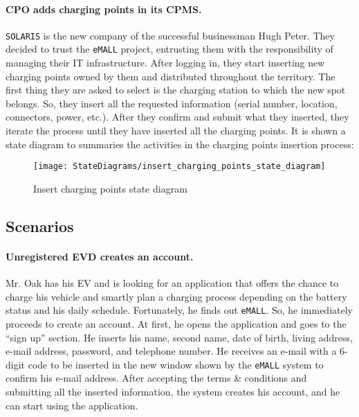 \paragraph{CPO adds charging points in its CPMS.}
\verb|SOLARIS| is the new company of the successful businessman Hugh Peter.
They decided to trust the \verb|eMALL| project, entrusting them with the responsibility of managing their IT infrastructure.
After logging in, they start inserting new charging points owned by them and distributed throughout the territory.
The first thing they are asked to select is the charging station to which the new spot belongs.
So, they insert all the requested information (serial number, location, connectors, power, etc.).
After they confirm and submit what they inserted, they iterate the process until they have inserted all the charging points.
It is shown a state diagram to summaries the activities in the charging points insertion process:
\begin{figure}[H]
    \begin{center}
        \texttt{[image: StateDiagrams/insert\_charging\_points\_state\_diagram]}
        \caption{Insert charging points state diagram}
        \label{fig:insert_charging_points_sd}%
    \end{center}
\end{figure}

\subsection{Scenarios}
\label{subsec:scenarios}%

\paragraph{Unregistered EVD creates an account.}
Mr. Oak has his EV and is looking for an application that offers the chance to charge his vehicle and smartly plan a
charging process depending on the battery status and his daily schedule.
Fortunately, he finds out \verb|eMALL|\@.
So, he immediately proceeds to create an account.
At first, he opens the application and goes to the ``sign up'' section.
He inserts his name, second name, date of birth, living address, e-mail address, password, and telephone number.
He receives an e-mail with a 6-digit code to be inserted in the new window shown by the \verb|eMALL| system to confirm his e-mail address.
After accepting the terms \& conditions and submitting all the inserted information, the system creates his account,
and he can start using the application.


